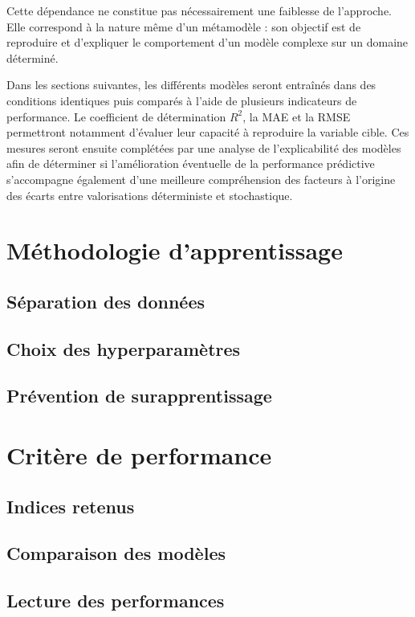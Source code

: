 Cette dépendance ne constitue pas nécessairement une faiblesse de l'approche. Elle correspond à la nature même d'un métamodèle : son objectif est de reproduire et d'expliquer le comportement d'un modèle complexe sur un domaine déterminé.

Dans les sections suivantes, les différents modèles seront entraînés dans des conditions identiques puis comparés à l'aide de plusieurs indicateurs de performance. Le coefficient de détermination $R^2$, la MAE et la RMSE permettront notamment d'évaluer leur capacité à reproduire la variable cible. Ces mesures seront ensuite complétées par une analyse de l'explicabilité des modèles afin de déterminer si l'amélioration éventuelle de la performance prédictive s'accompagne également d'une meilleure compréhension des facteurs à l'origine des écarts entre valorisations déterministe et stochastique.

\section{Méthodologie d'apprentissage}
\subsection{Séparation des données}
\subsection{Choix des hyperparamètres}
\subsection{Prévention de surapprentissage}

\section{Critère de performance}
\subsection{Indices retenus}
\subsection{Comparaison des modèles}
\subsection{Lecture des performances}
